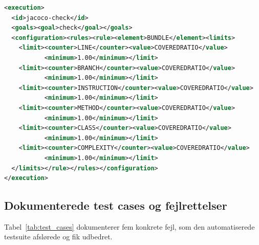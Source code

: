 \documentclass[11pt,a4paper]{article}
\begin{document}
\begin{table}[htbp]
\begin{lstlisting}[language=XML, caption={Global 100\,\% JaCoCo Coverage Gate i \texttt{backend/pom.xml}.}, label={lst:jacoco_gate}]
<execution>
  <id>jacoco-check</id>
  <goals><goal>check</goal></goals>
  <configuration><rules><rule><element>BUNDLE</element><limits>
    <limit><counter>LINE</counter><value>COVEREDRATIO</value>
           <minimum>1.00</minimum></limit>
    <limit><counter>BRANCH</counter><value>COVEREDRATIO</value>
           <minimum>1.00</minimum></limit>
    <limit><counter>INSTRUCTION</counter><value>COVEREDRATIO</value>
           <minimum>1.00</minimum></limit>
    <limit><counter>METHOD</counter><value>COVEREDRATIO</value>
           <minimum>1.00</minimum></limit>
    <limit><counter>CLASS</counter><value>COVEREDRATIO</value>
           <minimum>1.00</minimum></limit>
    <limit><counter>COMPLEXITY</counter><value>COVEREDRATIO</value>
           <minimum>1.00</minimum></limit>
  </limits></rule></rules></configuration>
</execution>
\end{lstlisting}

\subsection{Dokumenterede test cases og fejlrettelser}
Tabel~\ref{tab:test_cases} dokumenterer fem konkrete fejl, som den automatiserede testsuite afslørede og fik udbedret.


\end{table}
\end{document}
